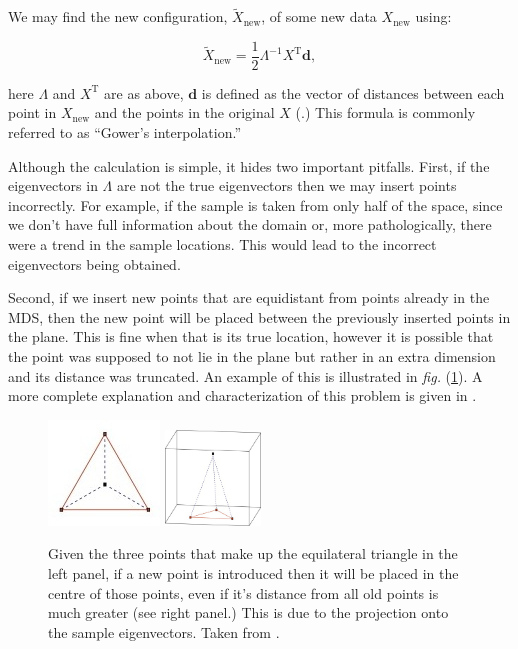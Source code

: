 \documentclass[a4paper,10pt]{amsart}
\newcommand{\fig}[1]{\emph{fig.} (\ref{#1})}
\newcommand{\tr}[1]{#1^{\text{T}}}
\begin{document}
We may find the new configuration, $\tilde{X}_{\text{new}}$, of some new data $X_{\text{new}}$ using:

\begin{equation}
\tilde{X}_{\text{new}} = \frac{1}{2} \Lambda^{-1} \tr{X} \mathbf{d},
\end{equation}

here $\Lambda$ and $\tr{X}$ are as above, $\mathbf{d}$ is defined as the vector of distances between each point in $X_{\text{new}}$ and the points in the original $X$ (\cite{gower1968}.) This formula is commonly referred to as ``Gower's interpolation.''

Although the calculation is simple, it hides two important pitfalls. First, if the eigenvectors in $\Lambda$ are not the true eigenvectors then we may insert points incorrectly. For example, if the sample is taken from only half of the space, since we don't have full information about the domain or, more pathologically, there were a trend in the sample locations. This would lead to the incorrect eigenvectors being obtained.

Second, if we insert new points that are equidistant from points already in the MDS, then the new point will be placed between the previously inserted points in the plane. This is fine when that is its true location, however it is possible that the point was supposed to not lie in the plane but rather in an extra dimension and its distance was truncated. An example of this is illustrated in \fig{bojinsert}. A more complete explanation and characterization of this problem is given in \cite{Boj2009}.

\begin{figure}
\centering
\includegraphics{figs/boj0.jpg} \includegraphics[width=1in]{figs/boj1.jpg} \\
\caption{Given the three points that make up the equilateral triangle in the left panel, if a new point is introduced then it will be placed in the centre of those points, even if it's distance from all old points is much greater (see right panel.) This is due to the projection onto the sample eigenvectors. Taken from \cite{Boj2009}.}
\label{bojinsert}
\end{figure}
\end{document}
